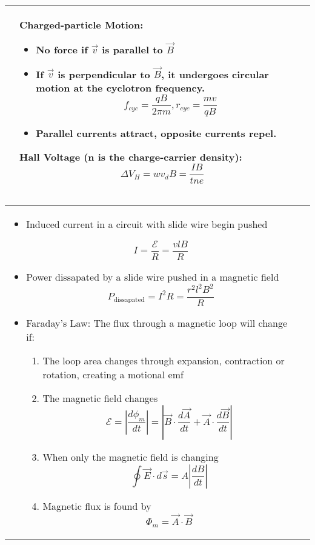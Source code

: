 \documentclass{article}
\begin{document}
\begin{center}
\begin{tabular}{|p{8cm}|p{8cm}|}
		                &

		Charged-particle Motion:
		\begin{itemize}
			\item No force if $\vec{v}$ is parallel to $\vec{B}$
			\item If $\vec{v}$ is perpendicular to $\vec{B}$, it undergoes circular motion at the cyclotron frequency.
			      \[ f_{cyc} = \frac{qB}{2\pi m}, r_{cyc} = \frac{mv}{qB}\]
			\item Parallel currents attract, opposite currents repel.
		\end{itemize}

		Hall Voltage (n is the charge-carrier density):
		\[ \Delta V_H = wv_dB = \frac{IB}{tne}\]                                            \\
		\hline
	\end{tabular}
	\begin{tabular}{|p{8cm}|p{8cm}|}
		\hline

		\begin{itemize}
			\item Induced current in a circuit with slide wire begin pushed

			      \[ I = \frac{\mathcal{E}}{R} = \frac{vlB}{R} \]

			\item Power dissapated by a slide wire pushed in a magnetic field
			      \[ P_\text{dissapated} = I^2 R = \frac{r^2 l^2 B^2}{R} \]
			\item Faraday's Law: The flux through a magnetic loop
			      will change if:

			      \begin{enumerate}
				      \item The loop area changes through expansion, contraction or rotation, creating a motional emf
				      \item The magnetic field changes
				            \[\mathcal{E} = \left\lvert \frac{d\phi_m}{dt}\right\rvert = \left\lvert \vec{B} \cdot \frac{d\vec{A}}{dt} + \vec{A} \cdot \frac{d\vec{B}}{dt}\right\rvert\]
				      \item When only the magnetic field is changing\[ \oint \vec{E} \cdot d\vec{s} = A\left\lvert \frac{dB}{dt}\right\rvert\]
				      \item Magnetic flux is found by\[ \Phi_m = \vec{A}\cdot\vec{B}\]
			      \end{enumerate}
		\end{itemize}


		 &


\end{tabular}
\end{center}
\end{document}
